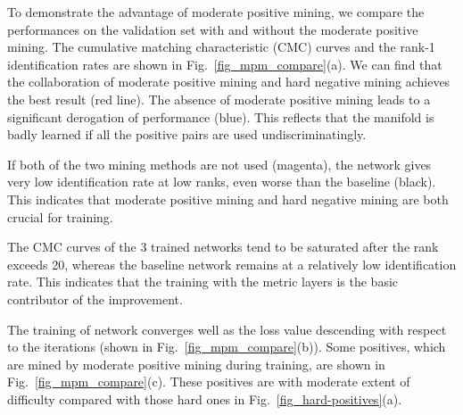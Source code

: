 \documentclass[runningheads]{llncs}
\begin{document}
To demonstrate the advantage of moderate positive mining, we compare the performances on the validation set with and without the moderate positive mining.
The cumulative matching characteristic (CMC) curves and the rank-1 identification rates are shown in Fig.~\ref{fig_mpm_compare}(a).
We can find that the collaboration of moderate positive mining and hard negative mining achieves the best result (red line).
The absence of moderate positive mining leads to a significant derogation of performance (blue).
This reflects that the manifold is badly learned if all the positive pairs are used undiscriminatingly.

If both of the two mining methods are not used (magenta), the network gives very low identification rate at low ranks, even worse than the baseline (black).
This indicates that moderate positive mining and hard negative mining are both crucial for training.

The CMC curves of the 3 trained networks tend to be saturated after the rank exceeds 20, whereas the baseline network remains at a relatively low identification rate.
This indicates that the training with the metric layers is the basic contributor of the improvement.

The training of network converges well as the loss value descending with respect to the iterations (shown in Fig.~\ref{fig_mpm_compare}(b)). Some positives, which are mined by moderate positive mining during training, are shown in Fig.~\ref{fig_mpm_compare}(c). These positives are with moderate extent of difficulty compared with those hard ones in Fig.~\ref{fig_hard-positives}(a).



\begin{figure*}[!h]
  \centering
  \hspace{2pt}
  \caption{(a) Performance analysis of moderate positive mining.
  Red: both moderate positive mining and hard negative mining are employed.
  Blue: only hard negative mining is employed.
  Magenta: no mining technique is employed during training.
  Black: the softmax baseline.
  (b) The loss curves along training iterations. Black: training set. Red: validation set.
  (c) Some positives mined by the moderate positive mining method.}

  \label{fig_mpm_compare}
\end{figure*}
\end{document}
